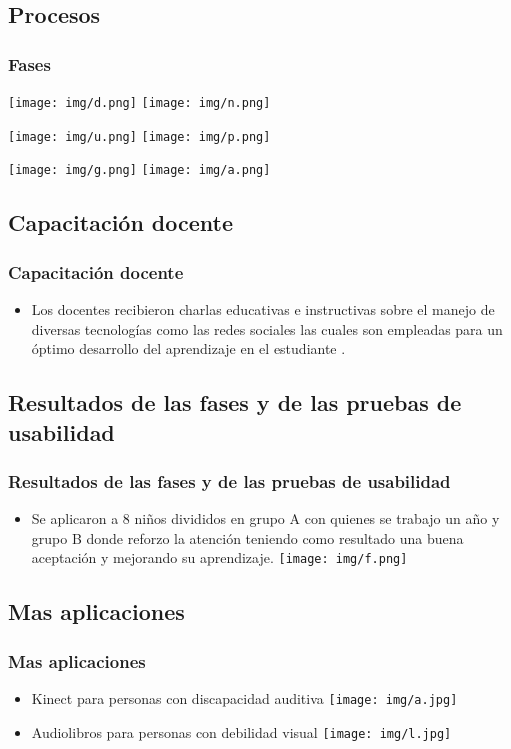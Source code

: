 \documentclass[11pt]{beamer}
\begin{document}
\begin{frame}
\section{Procesos}
\frametitle{Fases}
{\texttt{[image: img/d.png]}}
{\texttt{[image: img/n.png]}}
\end{frame}

\begin{frame}
{\texttt{[image: img/u.png]}}
{\texttt{[image: img/p.png]}}
\end{frame}

\begin{frame}
{\texttt{[image: img/g.png]}}
{\texttt{[image: img/a.png]}}
\end{frame}

\begin{frame}
\section{Capacitación docente}
\frametitle{Capacitación docente}
\begin{itemize}
\item Los docentes recibieron charlas educativas e instructivas sobre el manejo de diversas tecnologías como las redes sociales las cuales son  empleadas para un óptimo desarrollo del aprendizaje en el estudiante .
\end{itemize}
\end{frame}

\begin{frame}
\section{Resultados de las fases y de las pruebas de usabilidad}
\frametitle{Resultados de las fases y de las pruebas de usabilidad}
\begin{itemize}
\item Se aplicaron a 8 niños divididos en grupo A con quienes se trabajo un año y grupo B donde reforzo la atención teniendo como resultado una buena aceptación y mejorando su aprendizaje.
{\texttt{[image: img/f.png]}}

\end{itemize}
\end{frame}

\begin{frame}
\section{Mas aplicaciones}
\frametitle{Mas aplicaciones}
\begin{itemize}
\item Kinect para personas con discapacidad auditiva
{\texttt{[image: img/a.jpg]}}
\item Audiolibros para personas con debilidad visual
{\texttt{[image: img/l.jpg]}}
\end{itemize}
\end{frame}
\end{document}
